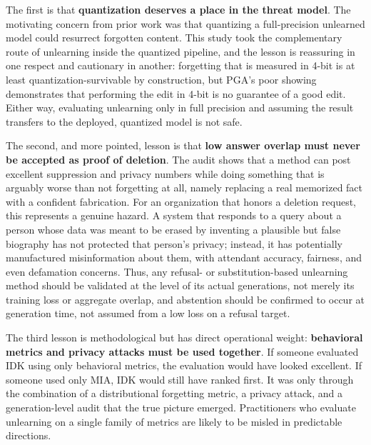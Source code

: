 \documentclass[a4paper,12pt]{report}
\begin{document}
The first is that \textbf{quantization deserves a place in the threat model}. The motivating concern from prior work was that quantizing a full-precision unlearned model could resurrect forgotten content. This study took the complementary route of unlearning inside the quantized pipeline, and the lesson is reassuring in one respect and cautionary in another: forgetting that is measured in 4-bit is at least quantization-survivable by construction, but PGA's poor showing demonstrates that performing the edit in 4-bit is no guarantee of a good edit. Either way, evaluating unlearning only in full precision and assuming the result transfers to the deployed, quantized model is not safe.

The second, and more pointed, lesson is that \textbf{low answer overlap must never be accepted as proof of deletion}. The audit shows that a method can post excellent suppression and privacy numbers while doing something that is arguably worse than not forgetting at all, namely replacing a real memorized fact with a confident fabrication. For an organization that honors a deletion request, this represents a genuine hazard. A system that responds to a query about a person whose data was meant to be erased by inventing a plausible but false biography has not protected that person's privacy; instead, it has potentially manufactured misinformation about them, with attendant accuracy, fairness, and even defamation concerns. Thus, any refusal- or substitution-based unlearning method should be validated at the level of its actual generations, not merely its training loss or aggregate overlap, and abstention should be confirmed to occur at generation time, not assumed from a low loss on a refusal target.

The third lesson is methodological but has direct operational weight: \textbf{behavioral metrics and privacy attacks must be used together}. If someone evaluated IDK using only behavioral metrics, the evaluation would have looked excellent. If someone used only MIA, IDK would still have ranked first. It was only through the combination of a distributional forgetting metric, a privacy attack, and a generation-level audit that the true picture emerged. Practitioners who evaluate unlearning on a single family of metrics are likely to be misled in predictable directions.
\end{document}
